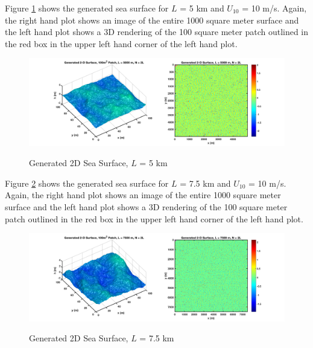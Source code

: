 Figure \ref{os_fig:11} shows the generated sea surface for $L$ = 5 km and $U_{10}$ = 10 m/s. Again, the right hand plot shows an image of the entire 1000 square meter surface and the left hand plot shows a 3D rendering of the 100 square meter patch outlined in the red box in the upper left hand corner of the left hand plot.
\begin{figure}[H]
  \begin{center}
\includegraphics[width=6in]{../media/Ocean_Surface/sea_surface_2d_surf_5000.png}
  \end{center}
  \renewcommand{\baselinestretch}{1} \small\normalsize
  \begin{quote}
    \caption[Generated 2D Sea Surface, $L$ = 5 km]{Generated 2D Sea Surface, $L$ = 5 km \label{os_fig:11}}
  \end{quote}
\end{figure}
\renewcommand{\baselinestretch}{2} \small\normalsize

Figure \ref{os_fig:12} shows the generated sea surface for $L$ = 7.5 km and $U_{10}$ = 10 m/s. Again, the right hand plot shows an image of the entire 1000 square meter surface and the left hand plot shows a 3D rendering of the 100 square meter patch outlined in the red box in the upper left hand corner of the left hand plot.
\begin{figure}[H]
  \begin{center}
\includegraphics[width=6in]{../media/Ocean_Surface/sea_surface_2d_surf_7500.png}
  \end{center}
  \renewcommand{\baselinestretch}{1} \small\normalsize
  \begin{quote}
    \caption[Generated 2D Sea Surface, $L$ = 7.5 km]{Generated 2D Sea Surface, $L$ = 7.5 km \label{os_fig:12}}
  \end{quote}
\end{figure}
\renewcommand{\baselinestretch}{2} \small\normalsize